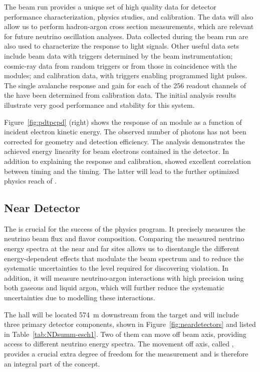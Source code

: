 The  beam run provides a unique set of high quality data for detector performance characterization, physics studies, and calibration. The data will also
allow us to perform hadron-argon cross section measurements, which are relevant for future  neutrino oscillation analyses.
Data collected during the beam run are also used to characterize the  response to light signals. Other useful data sets include
beam data with triggers determined by the beam instrumentation; cosmic-ray data  from random triggers or from those in coincidence with the  modules; and calibration data, with triggers enabling programmed light pulses. 
The single avalanche response and gain for each of the 256 readout channels of the  have been determined from calibration data.
The initial analysis results illustrate very good performance and stability for this system.

Figure~\ref{fig:pdtpcpd} (right) shows the response of an %
  module as a function of incident electron kinetic energy.
The observed number of photons has not been corrected for geometry and detection efficiency. The analysis demonstrates the achieved energy linearity for beam electrons contained in the detector.  
In addition to explaining the  response and calibration,  showed excellent correlation between  timing and the  timing. The latter will lead to the further optimized physics reach of . 


\subsection{Near Detector}
\label{sec:nd-verview}


The   is crucial for the success of the  physics program. It precisely measures the neutrino beam flux and flavor composition. Comparing the measured neutrino energy spectra at the near and far sites allows us to disentangle the different energy-dependent effects that modulate the beam spectrum and to reduce the systematic uncertainties to the level required for discovering  violation. In addition, it will measure neutrino-argon interactions with high precision using both gaseous and liquid argon, which will further reduce the systematic uncertainties due to modelling these interactions.


The  hall will be located \SI{574}{m} downstream from the target and will include three primary detector components, shown in Figure~\ref{fig:neardetectors}  and listed in Table~\ref{tab:NDsumm-esch1}. Two of them can move off beam axis, providing access to different neutrino energy spectra. The movement off axis, called , provides a crucial extra degree of freedom for the  measurement and is therefore an integral part of the   concept. 


